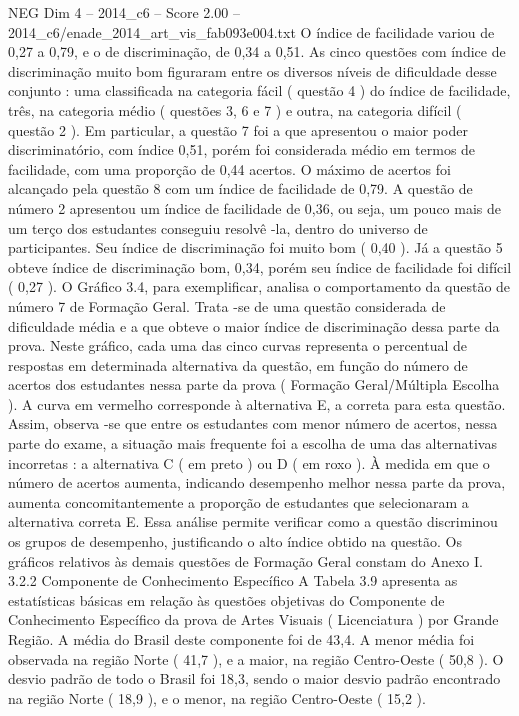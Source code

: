 \begin{textsample}{NEG Dim 4 – 2014\_c6 – Score 2.00 – 2014\_c6/enade\_2014\_art\_vis\_fab093e004.txt}
O índice de facilidade variou de 0,27 a 0,79, e o de discriminação, de 0,34 a 0,51.
As cinco questões com índice de discriminação muito bom figuraram entre os diversos níveis de dificuldade desse conjunto : uma classificada na categoria fácil ( questão 4 ) do índice de facilidade, três, na categoria médio ( questões 3, 6 e 7 ) e outra, na categoria difícil ( questão 2 ).
Em particular, a questão 7 foi a que apresentou o maior poder discriminatório, com índice 0,51, porém foi considerada médio em termos de facilidade, com uma proporção de 0,44 acertos.
O máximo de acertos foi alcançado pela questão 8 com um índice de facilidade de 0,79.
A questão de número 2 apresentou um índice de facilidade de 0,36, ou seja, um pouco mais de um terço dos estudantes conseguiu resolvê -la, dentro do universo de participantes.
Seu índice de discriminação foi muito bom ( 0,40 ).
Já a questão 5 obteve índice de discriminação bom, 0,34, porém seu índice de facilidade foi difícil ( 0,27 ).
O Gráfico 3.4, para exemplificar, analisa o comportamento da questão de número 7 de Formação Geral.
Trata -se de uma questão considerada de dificuldade média e a que obteve o maior índice de discriminação dessa parte da prova.
Neste gráfico, cada uma das cinco curvas representa o percentual de respostas em determinada alternativa da questão, em função do número de acertos dos estudantes nessa parte da prova ( Formação Geral/Múltipla Escolha ).
A curva em vermelho corresponde à alternativa E, a correta para esta questão.
Assim, observa -se que entre os estudantes com menor número de acertos, nessa parte do exame, a situação mais frequente foi a escolha de uma das alternativas incorretas : a alternativa C ( em preto ) ou D ( em roxo ).
À medida em que o número de acertos aumenta, indicando desempenho melhor nessa parte da prova, aumenta concomitantemente a proporção de estudantes que selecionaram a alternativa correta E.
Essa análise permite verificar como a questão discriminou os grupos de desempenho, justificando o alto índice obtido na questão.
Os gráficos relativos às demais questões de Formação Geral constam do Anexo I. 3.2.2 Componente de Conhecimento Específico A Tabela 3.9 apresenta as estatísticas básicas em relação às questões objetivas do Componente de Conhecimento Específico da prova de Artes Visuais ( Licenciatura ) por Grande Região.
A média do Brasil deste componente foi de 43,4.
A menor média foi observada na região Norte ( 41,7 ), e a maior, na região Centro-Oeste ( 50,8 ).
O desvio padrão de todo o Brasil foi 18,3, sendo o maior desvio padrão encontrado na região Norte ( 18,9 ), e o menor, na região Centro-Oeste ( 15,2 ).

\end{textsample}
